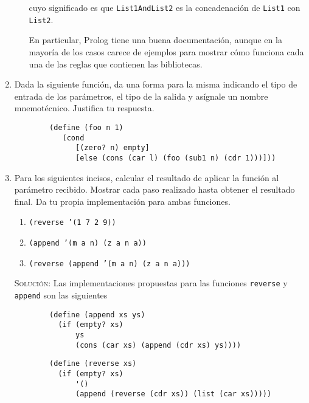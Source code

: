 \documentclass[letterpaper,11pt]{article}
\begin{document}
\begin{enumerate}
\begin{enumerate}
        cuyo significado es que \texttt{List1AndList2} es la concadenación de 
        \texttt{List1} con \texttt{List2}. 

        En particular, Prolog tiene una buena documentación, aunque en la mayoría
        de los casos carece de ejemplos para mostrar cómo funciona cada una de 
        las reglas que contienen las bibliotecas.
    \end{enumerate}

    \item Dada la siguiente función, da una forma para la misma indicando el 
    tipo de entrada de los parámetros, el tipo de la salida y asígnale un nombre 
    mnemotécnico. Justifica tu respuesta. 
    \begin{verbatim}
        (define (foo n 1)
           (cond 
              [(zero? n) empty]
              [else (cons (car l) (foo (sub1 n) (cdr 1)))]))
    \end{verbatim}

    \item Para los siguientes incisos, calcular el resultado de aplicar la 
    función al parámetro recibido. Mostrar cada paso realizado hasta obtener el 
    resultado final. Da tu propia implementación para ambas funciones.
    \begin{enumerate}
        \item \texttt{(reverse '(1 7 2 9))}
        \item \texttt{(append '(m a n) (z a n a))}
        \item \texttt{(reverse (append '(m a n) (z a n a)))}
    \end{enumerate} 

    \textsc{Solución:} Las implementaciones propuestas para las funciones 
    \texttt{reverse} y \texttt{append} son las siguientes 
    \begin{verbatim}
        (define (append xs ys)
          (if (empty? xs)
              ys
              (cons (car xs) (append (cdr xs) ys))))
    \end{verbatim}
    \begin{verbatim}
        (define (reverse xs)
          (if (empty? xs)
              '()
              (append (reverse (cdr xs)) (list (car xs)))))
    \end{verbatim}


\end{enumerate}
\end{document}
